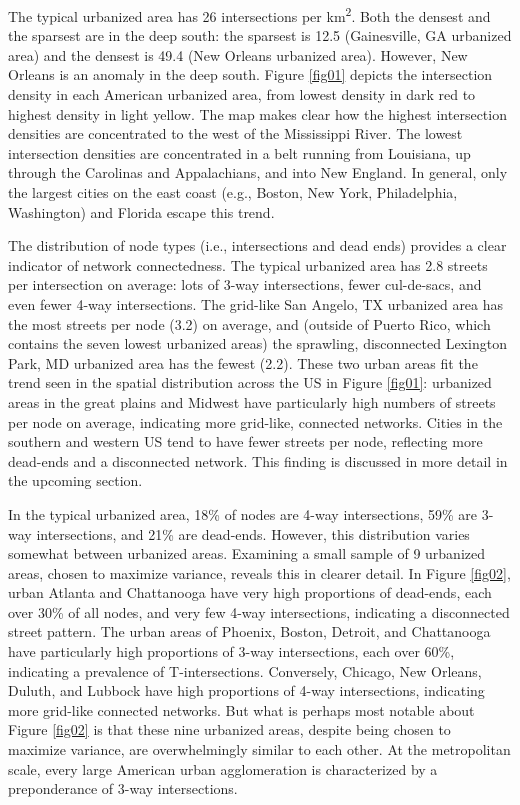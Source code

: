 \documentclass{article}
\begin{document}
The typical urbanized area has 26 intersections per km\textsuperscript{2}. Both the densest and the sparsest are in the deep south: the sparsest is 12.5 (Gainesville, GA urbanized area) and the densest is 49.4 (New Orleans urbanized area). However, New Orleans is an anomaly in the deep south. Figure \ref{fig01} depicts the intersection density in each American urbanized area, from lowest density in dark red to highest density in light yellow. The map makes clear how the highest intersection densities are concentrated to the west of the Mississippi River. The lowest intersection densities are concentrated in a belt running from Louisiana, up through the Carolinas and Appalachians, and into New England. In general, only the largest cities on the east coast (e.g., Boston, New York, Philadelphia, Washington) and Florida escape this trend.

The distribution of node types (i.e., intersections and dead ends) provides a clear indicator of network connectedness. The typical urbanized area has 2.8 streets per intersection on average: lots of 3-way intersections, fewer cul-de-sacs, and even fewer 4-way intersections. The grid-like San Angelo, TX urbanized area has the most streets per node (3.2) on average, and (outside of Puerto Rico, which contains the seven lowest urbanized areas) the sprawling, disconnected Lexington Park, MD urbanized area has the fewest (2.2). These two urban areas fit the trend seen in the spatial distribution across the US in Figure \ref{fig01}: urbanized areas in the great plains and Midwest have particularly high numbers of streets per node on average, indicating more grid-like, connected networks. Cities in the southern and western US tend to have fewer streets per node, reflecting more dead-ends and a disconnected network. This finding is discussed in more detail in the upcoming section.

In the typical urbanized area, 18\% of nodes are 4-way intersections, 59\% are 3-way intersections, and 21\% are dead-ends. However, this distribution varies somewhat between urbanized areas. Examining a small sample of 9 urbanized areas, chosen to maximize variance, reveals this in clearer detail. In Figure \ref{fig02}, urban Atlanta and Chattanooga have very high proportions of dead-ends, each over 30\% of all nodes, and very few 4-way intersections, indicating a disconnected street pattern. The urban areas of Phoenix, Boston, Detroit, and Chattanooga have particularly high proportions of 3-way intersections, each over 60\%, indicating a prevalence of T-intersections. Conversely, Chicago, New Orleans, Duluth, and Lubbock have high proportions of 4-way intersections, indicating more grid-like connected networks. But what is perhaps most notable about Figure \ref{fig02} is that these nine urbanized areas, despite being chosen to maximize variance, are overwhelmingly similar to each other. At the metropolitan scale, every large American urban agglomeration is characterized by a preponderance of 3-way intersections.
\end{document}
